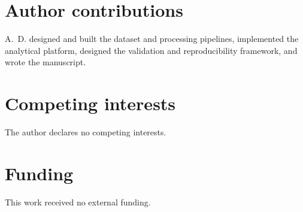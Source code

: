 \documentclass[10pt,a4paper]{article}
\begin{document}
\section*{Author contributions}
A.~D. designed and built the dataset and processing pipelines, implemented the analytical platform, designed the validation and reproducibility framework, and wrote the manuscript.

\section*{Competing interests}
The author declares no competing interests.

\section*{Funding}
This work received no external funding.
\end{document}
